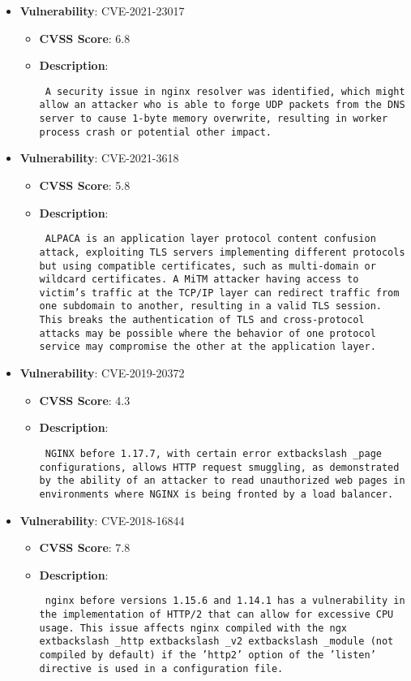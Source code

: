 \documentclass{article}
\begin{document}
\begin{itemize}
        \item \textbf{Vulnerability}: CVE-2021-23017
        \begin{itemize}
            \item \textbf{CVSS Score}:  6.8 
            \item \textbf{Description}: \parbox{\linewidth}{\texttt{ A security issue in nginx resolver was identified, which might allow an attacker who is able to forge UDP packets from the DNS server to cause 1-byte memory overwrite, resulting in worker process crash or potential other impact. }}
        \end{itemize}
    
        \item \textbf{Vulnerability}: CVE-2021-3618
        \begin{itemize}
            \item \textbf{CVSS Score}:  5.8 
            \item \textbf{Description}: \parbox{\linewidth}{\texttt{ ALPACA is an application layer protocol content confusion attack, exploiting TLS servers implementing different protocols but using compatible certificates, such as multi-domain or wildcard certificates. A MiTM attacker having access to victim's traffic at the TCP/IP layer can redirect traffic from one subdomain to another, resulting in a valid TLS session. This breaks the authentication of TLS and cross-protocol attacks may be possible where the behavior of one protocol service may compromise the other at the application layer. }}
        \end{itemize}
    
        \item \textbf{Vulnerability}: CVE-2019-20372
        \begin{itemize}
            \item \textbf{CVSS Score}:  4.3 
            \item \textbf{Description}: \parbox{\linewidth}{\texttt{ NGINX before 1.17.7, with certain error	extbackslash _page configurations, allows HTTP request smuggling, as demonstrated by the ability of an attacker to read unauthorized web pages in environments where NGINX is being fronted by a load balancer. }}
        \end{itemize}
    
        \item \textbf{Vulnerability}: CVE-2018-16844
        \begin{itemize}
            \item \textbf{CVSS Score}:  7.8 
            \item \textbf{Description}: \parbox{\linewidth}{\texttt{ nginx before versions 1.15.6 and 1.14.1 has a vulnerability in the implementation of HTTP/2 that can allow for excessive CPU usage. This issue affects nginx compiled with the ngx	extbackslash _http	extbackslash _v2	extbackslash _module (not compiled by default) if the 'http2' option of the 'listen' directive is used in a configuration file. }}
        \end{itemize}
    

\end{itemize}
\end{document}
